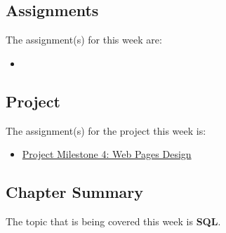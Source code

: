 \subsection{Assignments}

The assignment(s) for this week are:

\begin{itemize}
    \item {}
\end{itemize}

\subsection{Project}

The assignment(s) for the project this week is:

\begin{itemize}
    \item \href{https://applied.cs.colorado.edu/mod/assign/view.php?id=61379}{Project Milestone 4: Web Pages Design}
\end{itemize}

\subsection{Chapter Summary}

The topic that is being covered this week is \textbf{SQL}.

